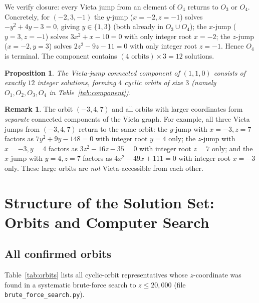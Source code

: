 \documentclass[12pt,a4paper]{article}
\newtheorem{proposition}[theorem]{Proposition}
\theoremstyle{definition}
\newtheorem{remark}[theorem]{Remark}
\begin{document}
We verify closure: every Vieta jump from an element of $O_4$ returns
to $O_3$ or $O_4$.  Concretely, for $(-2,3,-1)$ the $y$-jump
($x=-2,z=-1$) solves $-y^2+4y-3=0$, giving $y\in\{1,3\}$
(both already in $O_3\cup O_4$); the $x$-jump ($y=3,z=-1$) solves
$3x^2+x-10=0$ with only integer root $x=-2$; the $z$-jump ($x=-2,y=3$)
solves $2z^2-9z-11=0$ with only integer root $z=-1$.  Hence $O_4$ is
terminal.  The component contains $(4\text{ orbits})\times 3 = 12$
solutions.

\begin{proposition}\label{prop:component_finite}
  The Vieta-jump connected component of $(1,1,0)$ consists of exactly
  $12$ integer solutions, forming $4$ cyclic orbits of size $3$
  (namely $O_1, O_2, O_3, O_4$ in Table~\ref{tab:component}).
\end{proposition}

\begin{remark}
  The orbit $(-3,4,7)$ and all orbits with larger coordinates form
  \emph{separate} connected components of the Vieta graph.  For example,
  all three Vieta jumps from $(-3,4,7)$ return to the same orbit:
  the $y$-jump with $x=-3,z=7$ factors as $7y^2+9y-148=0$ with integer
  root $y=4$ only; the $z$-jump with $x=-3,y=4$ factors as
  $3z^2-16z-35=0$ with integer root $z=7$ only; and the $x$-jump with
  $y=4,z=7$ factors as $4x^2+49x+111=0$ with integer root $x=-3$ only.
  These large orbits are \emph{not} Vieta-accessible from each other.
\end{remark}

\section{Structure of the Solution Set: Orbits and Computer Search}
\label{sec:orbits}

\subsection{All confirmed orbits}

Table~\ref{tab:orbits} lists all cyclic-orbit representatives whose
$z$-coordinate was found in a systematic brute-force search to
$z \le 20{,}000$ (file \texttt{brute\_force\_search.py}).
\end{document}

